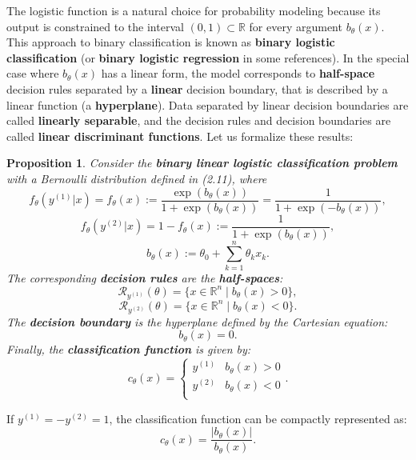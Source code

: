 \documentclass{report}
\newtheorem{proposition}{Proposition}[chapter]
\begin{document}
The logistic function is a natural choice for probability modeling because its output is constrained to the interval $(0, 1) \subset \mathbb{R}$ for every argument $b_\theta(x)$. This approach to binary classification is known as \textbf{binary logistic classification} (or \textbf{binary logistic regression} in some references). In the special case where $b_\theta(x)$ has a linear form, the model corresponds to \textbf{half-space} decision rules separated by a \textbf{linear} decision boundary, that is described by a linear function (a \textbf{hyperplane}). Data separated by linear decision boundaries are called \textbf{linearly separable}, and the decision rules and decision boundaries are called \textbf{linear discriminant functions}. Let us formalize these results:

\begin{proposition}
Consider the \textbf{binary linear logistic classification problem} with a Bernoulli distribution defined in (2.11), where
\begin{equation}
f_\theta(y^{(1)}|x) = f_\theta(x) := \frac{\exp(b_\theta(x))}{1+\exp(b_\theta(x))} = \frac{1}{1+\exp(-b_\theta(x))},
\end{equation}
\begin{equation}
f_\theta(y^{(2)}|x) = 1- f_\theta(x) := \frac{1}{1+\exp(b_\theta(x))},
\end{equation}
\begin{equation}
b_\theta(x) := \theta_0 + \sum_{k=1}^{n}\theta_kx_k.
\end{equation}
The corresponding \textbf{decision rules} are the \textbf{half-spaces}:
\begin{equation}
\mathcal{R}_{y^{(1)}}(\theta) = \{x \in \mathbb{R}^n \mid b_\theta(x) > 0 \},
\end{equation}
\begin{equation}
\mathcal{R}_{y^{(2)}}(\theta) = \{x \in \mathbb{R}^n \mid b_\theta(x) < 0 \}.
\end{equation}
The \textbf{decision boundary} is the hyperplane defined by the Cartesian equation:
\begin{equation}
b_\theta(x) = 0.
\end{equation}
Finally, the \textbf{classification function} is given by:
\begin{equation}
c_\theta(x) = \left\{\begin{matrix}
y^{(1)} & b_\theta(x) > 0\\
y^{(2)} & b_\theta(x) < 0\\
\end{matrix}\right..
\end{equation}
\end{proposition}
If $y^{(1)} = -y^{(2)} = 1$, the classification function can be compactly represented as:
\begin{equation}
c_\theta(x) = \frac{|b_\theta(x)|}{b_\theta(x)}.
\end{equation}
\end{document}

